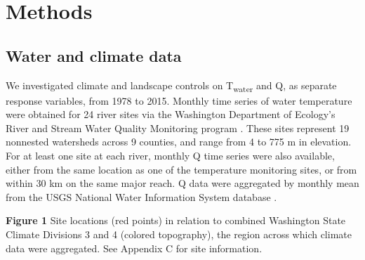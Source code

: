 \documentclass[notitlepage]{article}
\begin{document}
\section*{Methods}

\subsection*{Water and climate data}

We investigated climate and landscape controls on T\textsubscript{water} and Q, as separate response variables, from 1978 to 2015. Monthly time series of water temperature were obtained for 24 river sites via the Washington Department of Ecology's River and Stream Water Quality Monitoring program \citep{DoEwaterData}. These sites represent 19 nonnested watersheds across 9 counties, and range from 4 to 775 m in elevation. For at least one site at each river, monthly Q time series were also available, either from the same location as one of the temperature monitoring sites, or from within 30 km on the same major reach. Q data were aggregated by monthly mean from the USGS National Water Information System database \citep{USGSdischarge}.

\begin{center}
\textbf{Figure 1} Site locations (red points) in relation to combined Washington State Climate Divisions 3 and 4 (colored topography), the region across which climate data were aggregated. See Appendix C for site information.
\end{center}
\end{document}

